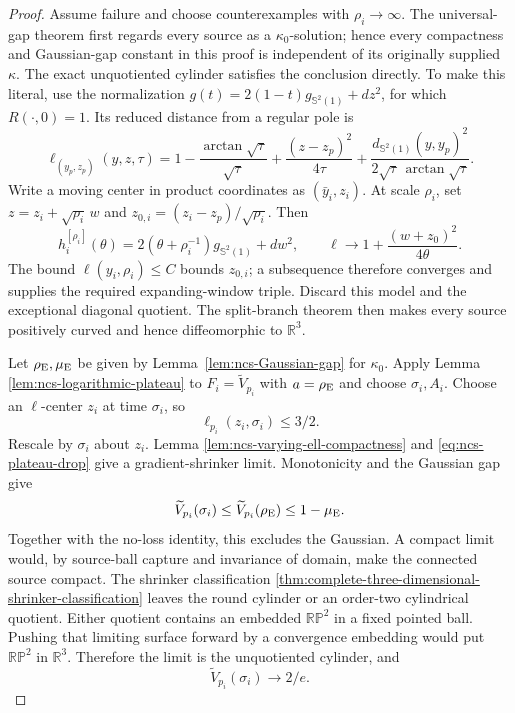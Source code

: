 \documentclass[10pt]{coll-l}
\newcommand{\R}{\mathbb{R}}
\newcommand{\Sph}{\mathbb{S}}
\theoremstyle{definition}
\theoremstyle{remark}
\numberwithin{section}{chapter}
\numberwithin{equation}{chapter}
\begin{document}
\begin{proof}
Assume failure and choose counterexamples with $\rho_i\to\infty$.  The
universal-gap theorem first regards every source as a
$\kappa_0$-solution; hence every compactness and Gaussian-gap constant in
this proof is independent of its originally supplied $\kappa$.  The
exact unquotiented cylinder satisfies the conclusion directly.  To make
this literal, use the normalization
$g(t)=2(1-t)g_{\Sph^2(1)}+dz^2$, for which $R(\cdot,0)=1$.  Its reduced
distance from a regular pole is
\begin{equation}
 \ell_{(y_p,z_p)}(y,z,\tau)
  =1-\frac{\arctan\sqrt\tau}{\sqrt\tau}
   +\frac{(z-z_p)^2}{4\tau}
   +\frac{d_{\Sph^2(1)}(y,y_p)^2}
          {2\sqrt\tau\,\arctan\sqrt\tau}.             \label{eq:ncs-regular-pole-cylinder-ell}
\end{equation}
Write a moving center in product coordinates as $(\bar y_i,z_i)$.  At
scale $\rho_i$, set
$z=z_i+\sqrt{\rho_i}\,w$ and
$z_{0,i}=(z_i-z_p)/\sqrt{\rho_i}$.  Then
\begin{equation}
 h_i^{[\rho_i]}(\theta)
   =2(\theta+\rho_i^{-1})g_{\Sph^2(1)}+dw^2,\qquad
 \ell\longrightarrow1+\frac{(w+z_0)^2}{4\theta}.     \label{eq:ncs-exact-cylinder-triple-limit}
\end{equation}
The bound $\ell(y_i,\rho_i)\leq C$ bounds $z_{0,i}$; a subsequence
therefore converges and supplies the required expanding-window triple.
Discard this model and the exceptional diagonal quotient.  The
split-branch theorem then
makes every source positively curved and hence diffeomorphic to $\R^3$.

Let $\rho_{\rm E},\mu_{\rm E}$ be given by
Lemma~\ref{lem:ncs-Gaussian-gap} for $\kappa_0$.  Apply Lemma
\ref{lem:ncs-logarithmic-plateau} to $F_i=\widetilde V_{p_i}$ with
$a=\rho_{\rm E}$ and choose $\sigma_i,A_i$.  Choose an
$\ell$-center $z_i$ at time $\sigma_i$, so
\begin{equation}
                         \ell_{p_i}(z_i,\sigma_i)\leq3/2.      \label{eq:ncs-plateau-ell-center}
\end{equation}
Rescale by $\sigma_i$ about $z_i$.  Lemma
\ref{lem:ncs-varying-ell-compactness} and
\eqref{eq:ncs-plateau-drop} give a gradient-shrinker limit.  Monotonicity
and the Gaussian gap give
\begin{equation}
 \widetilde V_{p_i}(\sigma_i)\leq
 \widetilde V_{p_i}(\rho_{\rm E})\leq1-\mu_{\rm E}.   \label{eq:ncs-plateau-nonGaussian}
\end{equation}
Together with the no-loss identity, this excludes the Gaussian.  A compact limit would,
by source-ball capture and invariance of domain, make the connected source
compact.  The shrinker classification
\ref{thm:complete-three-dimensional-shrinker-classification} leaves the
round cylinder or an order-two cylindrical quotient.  Either quotient
contains an embedded $\mathbb{RP}^2$ in a fixed pointed ball.  Pushing that
limiting surface forward by a convergence embedding would put
$\mathbb{RP}^2$ in $\R^3$.
Therefore the limit is the unquotiented cylinder, and
\begin{equation}
                   \widetilde V_{p_i}(\sigma_i)\longrightarrow2/e.       \label{eq:ncs-first-plateau-mass}
\end{equation}


\end{proof}
\end{document}
